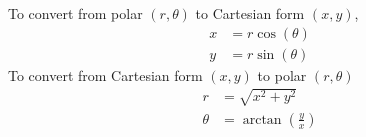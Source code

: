 \documentclass[11pt, a4paper]{article}
\begin{document}
\begin{figure}[H]
     \centering
\end{figure}
To convert from polar $(r,\theta)$ to Cartesian form $(x,y)$,
\vspace{-0.2cm}
\begin{align*}
x&=r\cos(\theta) \\
y&=r\sin(\theta)
\end{align*}
To convert from Cartesian form $(x,y)$ to polar $(r,\theta)$
\begin{align*}
r&=\sqrt{x^{2} + y^{2}} \\
\theta&=\arctan\left(\frac{y}{x}\right)
\end{align*}
\vspace{0.5cm}
\end{document}
